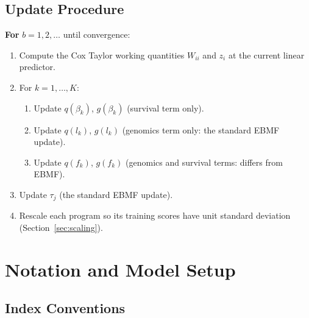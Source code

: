 \documentclass[11pt]{article}
\begin{document}
\subsection{Update Procedure}

\textbf{For} $b = 1, 2, \ldots$ until convergence:
\begin{enumerate}
  \item Compute the Cox Taylor working quantities $W_{ii}$ and $z_i$ at the
        current linear predictor.
  \item For $k = 1, \ldots, K$:
  \begin{enumerate}
    \item Update $q(\beta_k)$, $g(\beta_k)$ (survival term only).
    \item Update $q(l_k)$, $g(l_k)$ (genomics term only: the standard EBMF update).
    \item Update $q(f_k)$, $g(f_k)$ (genomics and survival terms: differs from EBMF).
  \end{enumerate}
  \item Update $\tau_j$ (the standard EBMF update).
  \item Rescale each program so its training scores have unit standard
        deviation (Section~\ref{sec:scaling}).
\end{enumerate}

\section{Notation and Model Setup}

\subsection{Index Conventions}
\end{document}
